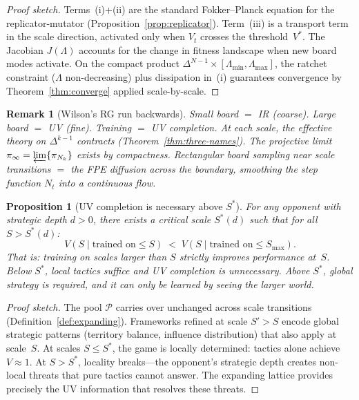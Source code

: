 \documentclass[11pt,a4paper]{article}
\newtheorem{proposition}[theorem]{Proposition}
\newtheorem{remark}[theorem]{Remark}
\newcommand{\cP}{\mathcal{P}}
\begin{document}
\begin{proof}[Proof sketch]
Terms~(i)+(ii) are the standard Fokker--Planck equation for
the replicator-mutator
(Proposition~\ref{prop:replicator}).
Term~(iii) is a transport term in the scale direction,
activated only when $V_t$ crosses the threshold~$V^*$.
The Jacobian $J(\Lambda)$ accounts for the change in fitness
landscape when new board modes activate.
On the compact product
$\Delta^{N-1} \times [\Lambda_{\min}, \Lambda_{\max}]$,
the ratchet constraint ($\Lambda$ non-decreasing) plus
dissipation in~(i) guarantees convergence by
Theorem~\ref{thm:converge} applied scale-by-scale.
\end{proof}

\begin{remark}[Wilson's RG run backwards]\label{rem:rg-backwards}
Small board $=$ IR (coarse).
Large board $=$ UV (fine).
Training $=$ UV completion.
At each scale, the effective theory on $\Delta^{k-1}$
contracts (Theorem~\ref{thm:three-names}).
The projective limit
$\pi_\infty = \varprojlim\{\pi_{N_k}\}$ exists by
compactness.
Rectangular board sampling near scale transitions $=$
the FPE diffusion across the boundary, smoothing the
step function $N_t$ into a continuous flow.
\end{remark}

\begin{proposition}[UV completion is necessary above $S^*$]%
\label{prop:uv-necessary}
For any opponent with strategic depth $d > 0$,
there exists a \emph{critical scale} $S^*(d)$ such that
for all $S > S^*(d)$:
\[
  V(S \mid \text{trained on} \leq S)
  \;<\;
  V(S \mid \text{trained on} \leq S_{\max}).
\]
That is: training on scales larger than $S$ strictly
improves performance at~$S$.
Below $S^*$, local tactics suffice and UV completion
is unnecessary.
Above $S^*$, global strategy is required, and it can
only be learned by seeing the larger world.
\end{proposition}

\begin{proof}[Proof sketch]
The pool $\cP$ carries over unchanged across scale transitions
(Definition~\ref{def:expanding}).
Frameworks refined at scale $S' > S$ encode global strategic
patterns (territory balance, influence distribution) that also
apply at scale~$S$.
At scales $S \leq S^*$, the game is locally determined:
tactics alone achieve $V \approx 1$.
At $S > S^*$, locality breaks---the opponent's strategic depth
creates non-local threats that pure tactics cannot answer.
The expanding lattice provides precisely the UV information
that resolves these threats.
\end{proof}
\end{document}
